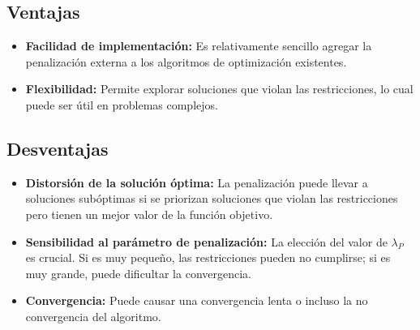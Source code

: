 \subsection*{Ventajas}

\begin{itemize}
    \item \textbf{Facilidad de implementación:} Es relativamente sencillo agregar la penalización externa a los algoritmos de optimización existentes.
    \item \textbf{Flexibilidad:} Permite explorar soluciones que violan las restricciones, lo cual puede ser útil en problemas complejos.
\end{itemize}

\subsection*{Desventajas}

\begin{itemize}
    \item \textbf{Distorsión de la solución óptima:} La penalización puede llevar a soluciones subóptimas si se priorizan soluciones que violan las restricciones pero tienen un mejor valor de la función objetivo.
    \item \textbf{Sensibilidad al parámetro de penalización:} La elección del valor de \( \lambda_P \) es crucial. Si es muy pequeño, las restricciones pueden no cumplirse; si es muy grande, puede dificultar la convergencia.
    \item \textbf{Convergencia:} Puede causar una convergencia lenta o incluso la no convergencia del algoritmo.
\end{itemize}